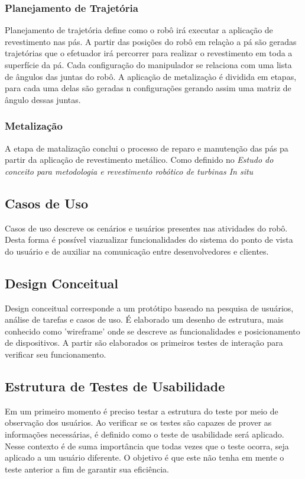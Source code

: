 \subsubsection{Planejamento de Trajetória}
Planejamento de trajetória define como o robô irá executar a aplicação de
revestimento nas pás. A partir das posições do robô em relaçào a pá são geradas
trajetórias que o efetuador irá percorrer para realizar o revestimento em toda a
superfície da pá. Cada configuração do manipulador se relaciona com uma lista de
ângulos das juntas do robô. A aplicação de metalizaçào é dividida em
etapas, para cada uma delas são geradas n configurações gerando assim uma matriz de
ângulo dessas juntas.

\subsubsection{Metalização}
A etapa de matalização conclui o processo de reparo e manutenção das pás pa
partir da aplicação de revestimento metálico. Como definido no \textit{Estudo do
conceito para metodologia e revestimento robótico de turbinas In situ}


\subsection{Casos de Uso}
Casos de uso descreve os cenários e usuários presentes nas atividades do robô.
Desta forma é possível viazualizar funcionalidades do sistema do ponto de vista
do usuário e de auxiliar na comunicação entre desenvolvedores e
clientes.

\subsection{Design Conceitual}
Design conceitual corresponde a um protótipo baseado na pesquisa de usuários,
análise de tarefas e casos de uso. É elaborado um desenho de estrutura, mais
conhecido como 'wireframe' onde se descreve as funcionalidades e posicionamento
de dispositivos. A partir são elaborados os primeiros testes de interação para
verificar seu funcionamento.

\subsection{Estrutura de Testes de Usabilidade}
Em um primeiro momento é preciso testar a estrutura do teste por meio de
observação dos usuários. Ao verificar se os testes são capazes de prover as
informações necessárias, é definido como o teste de usabilidade será aplicado.
Nesse contexto é de suma importância que todas vezes que o teste ocorra, seja
aplicado a um usuário diferente. O objetivo é que este não tenha em mente o
teste anterior a fim de garantir sua eficiência.







